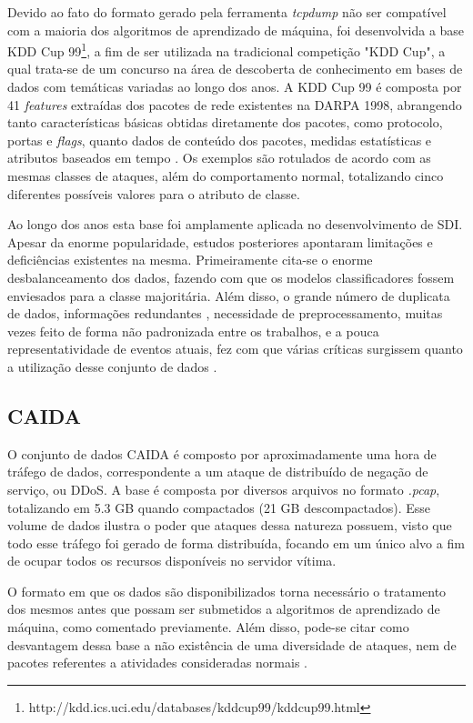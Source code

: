 Devido ao fato do formato gerado pela ferramenta \textit{tcpdump} não ser compatível com a maioria dos algoritmos de aprendizado de máquina, foi desenvolvida a base KDD Cup 99\footnote{http://kdd.ics.uci.edu/databases/kddcup99/kddcup99.html}, a fim de ser utilizada na tradicional competição "KDD Cup", a qual trata-se de um concurso na área de descoberta de conhecimento em bases de dados com temáticas variadas ao longo dos anos. A KDD Cup 99 é composta por 41 \textit{features} extraídas dos pacotes de rede existentes na DARPA 1998, abrangendo tanto características básicas obtidas diretamente dos pacotes, como protocolo, portas e \textit{flags}, quanto dados de conteúdo dos pacotes, medidas estatísticas e atributos baseados em tempo \cite{liu2019}. Os exemplos são rotulados de acordo com as mesmas classes de ataques, além do comportamento normal, totalizando cinco diferentes possíveis valores para o atributo de classe.

Ao longo dos anos esta base foi amplamente aplicada no desenvolvimento de SDI. Apesar da enorme popularidade, estudos posteriores apontaram limitações e deficiências existentes na mesma. Primeiramente cita-se o enorme desbalanceamento dos dados, fazendo com que os modelos classificadores fossem enviesados para a classe majoritária. Além disso, o grande número de duplicata de dados, informações redundantes \cite{mchugh2000}, necessidade de preprocessamento, muitas vezes feito de forma não padronizada entre os trabalhos, e a pouca representatividade de eventos atuais, fez com que várias críticas surgissem quanto a utilização desse conjunto de dados \cite{liu2019}.

\subsection{CAIDA}

O conjunto de dados CAIDA \cite{caida2007} é composto por aproximadamente uma hora de tráfego de dados, correspondente a um ataque de distribuído de negação de serviço, ou DDoS. A base é composta por diversos arquivos no formato \textit{.pcap}, totalizando em 5.3 GB quando compactados (21 GB descompactados). Esse volume de dados ilustra o poder que ataques dessa natureza possuem, visto que todo esse tráfego foi gerado de forma distribuída, focando em um único alvo a fim de ocupar todos os recursos disponíveis no servidor vítima.

O formato em que os dados são disponibilizados torna necessário o tratamento dos mesmos antes que possam ser submetidos a algoritmos de aprendizado de máquina, como comentado previamente. Além disso, pode-se citar como desvantagem dessa base a não existência de uma diversidade de ataques, nem de pacotes referentes a atividades consideradas normais \cite{khraisat2019}.

